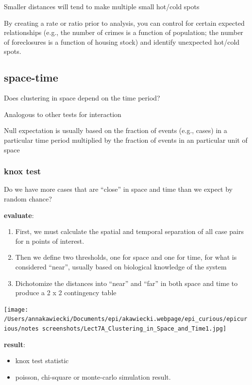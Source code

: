\documentclass[
]{article}
\begin{document}
Smaller distances will tend to make multiple small hot/cold spots

By creating a rate or ratio prior to analysis, you can control for
certain expected relationships (e.g., the number of crimes is a function
of population; the number of foreclosures is a function of housing
stock) and identify unexpected hot/cold spots.

\hypertarget{space-time}{%
\subsection{space-time}\label{space-time}}

Does clustering in space depend on the time period?

Analogous to other tests for interaction

Null expectation is usually based on the fraction of events (e.g.,
cases) in a particular time period multiplied by the fraction of events
in an particular unit of space

\hypertarget{knox-test}{%
\subsubsection{knox test}\label{knox-test}}

Do we have more cases that are ``close'' in space and time than we
expect by random chance?

\textbf{evaluate}:

\begin{enumerate}
\def\labelenumi{\arabic{enumi}.}
\item
  First, we must calculate the spatial and temporal separation of all
  case pairs for n points of interest.
\item
  Then we define two thresholds, one for space and one for time, for
  what is considered ``near'', usually based on biological knowledge of
  the system
\item
  Dichotomize the distances into ``near'' and ``far'' in both space and
  time to produce a 2 x 2 contingency table
\end{enumerate}

\texttt{[image: /Users/annakawiecki/Documents/epi/akawiecki.webpage/epi\_curious/epicurious/notes screenshots/Lect7A\_Clustering\_in\_Space\_and\_Time1.jpg]}

\textbf{result}:

\begin{itemize}
\item
  knox test statistic
\item
  poisson, chi-square or monte-carlo simulation result.
\end{itemize}
\end{document}
